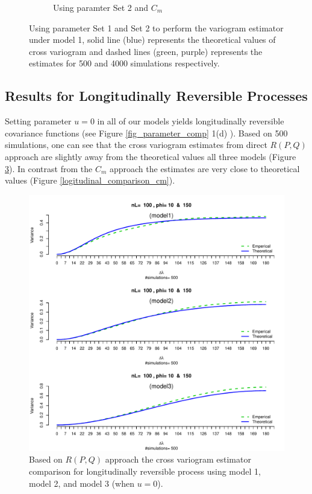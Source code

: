 \begin{figure}[H]
\begin{subfigure}{.5\textwidth}
		\caption{Using paramter Set 2 and $C_m$}
		\label{fig:sfig2}
	\end{subfigure}
	\caption[Using Parameter Set 1 and Set 2 to Perform The Variogram Estimator]{Using parameter Set 1 and Set 2 to perform the variogram estimator under model 1, solid line (blue) represents the theoretical values of cross variogram and dashed lines (green, purple) represents the estimates for 500 and 4000 simulations respectively. }
	\label{compare_varigram_sim_1}
\end{figure}


\subsection{Results for Longitudinally Reversible Processes}

Setting parameter $u = 0$ in all of our models yields longitudinally reversible covariance functions (see Figure \ref{fig_parameter_comp} 1(d) ). Based on 500 simulations, one can see that the cross variogram estimates from direct $R(P,Q)$ approach are slightly away from the theoretical values all three models (Figure \ref{logitudinal_comparison_rpq}). In contrast from the $C_m$ approach the estimates are very close to theoretical values (Figure \ref{logitudinal_comparison_cm}).

\begin{figure}[H]
	\centering
	\includegraphics [scale =.9, keepaspectratio]{graphs/results_variogram_comparison_rpq}
	\caption[Based on $R(P,Q)$ Approach the Cross Variogram Estimator Comparison]{Based on $R(P,Q)$ approach the cross variogram estimator comparison for longitudinally reversible process using  model 1, model 2, and model 3 (when $u=0$).}
	\label{logitudinal_comparison_rpq}
\end{figure}

